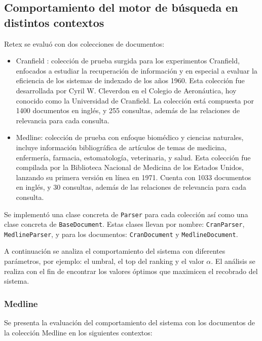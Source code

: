 \subsection{Comportamiento del motor de búsqueda en distintos contextos}

Retex se evaluó con dos colecciones de documentos:

\begin{itemize}
    \item Cranfield \cite{cran}: colección de prueba surgida para los experimentos Cranfield, enfocados a estudiar la recuperación de información y en especial a evaluar la eficiencia de los sistemas de indexado de los años 1960. Esta colección fue desarrollada por Cyril W. Cleverdon en el Colegio de Aeronáutica, hoy conocido como la Universidad de Cranfield. La colección está compuesta por 1400 documentos en inglés, y 255 consultas, además de las relaciones de relevancia para cada consulta.
    \item Medline: colección de prueba con enfoque biomédico y ciencias naturales, incluye información bibliográfica de artículos de temas de medicina, enfermería, farmacia, estomatología, veterinaria, y salud. Esta colección fue compilada por la Biblioteca Nacional de Medicina de los Estados Unidos, lanzando su primera versión en línea en 1971. Cuenta con 1033 documentos en inglés, y 30 consultas, además de las relaciones de relevancia para cada consulta.
\end{itemize}

Se implementó una clase concreta de \verb|Parser| para cada colección así como una clase concreta de \verb|BaseDocument|. Estas clases llevan por nombre: \verb|CranParser|, \verb|MedlineParser|, y para los documentos: \verb|CranDocument| y \verb|MedlineDocument|.

A continuación se analiza el comportamiento del sistema con diferentes parámetros, por ejemplo: el umbral, el top del ranking y el valor $\alpha$. El análisis se realiza con el fin de encontrar los valores óptimos que maximicen el recobrado del sistema.

\subsubsection{Medline}

Se presenta la evaluación del comportamiento del sistema con los documentos de la colección Medline en los siguientes contextos:

